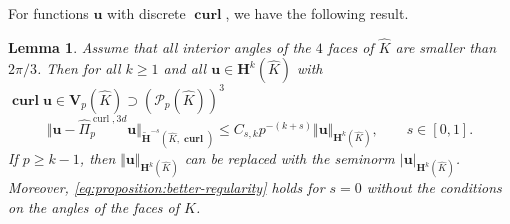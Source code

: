 \documentclass{article}
\newtheorem{lemma}[theorem]{Lemma}
\newcommand{\hatPicurlcom}{\widehat \Pi^{\operatorname*{curl},3d}_p}
\begin{document}
For functions ${\mathbf u}$ with discrete $\operatorname{\mathbf{curl}}$, we have the following result.

\begin{lemma}
\label{lemma:better-regularity}
Assume that all interior angles of the $4$ faces of $\widehat K$ are smaller than $2 \pi/3$.
Then for all $k\geq1$ and
all ${\mathbf{u}}\in{\mathbf{H}}^{k}(\widehat{K})$ with $\operatorname*{\mathbf{curl}}%
{\mathbf{u}}\in {\mathbf V}_p(\widehat K)  \supset ({\mathcal{P}}_{p}(\widehat{K}))^{3}$ 
\begin{equation}
\Vert{\mathbf{u}}-\hatPicurlcom{\mathbf{u}}%
\Vert_{\widetilde{\mathbf{H}}^{-s}(\widehat{K},\operatorname{\mathbf{curl}})}\leq C_{s,k}p^{-(k+s)}\Vert{\mathbf{u}}\Vert
_{\mathbf{H}^{k}(\widehat{K})}, \qquad s\in [0,1].
\label{eq:proposition:better-regularity}%
\end{equation}
If $p\geq k-1$, then $\Vert{\mathbf{u}}\Vert_{{\mathbf{H}}%
^{k}(\widehat{K})}$ can be replaced with the seminorm $|{\mathbf{u}%
}|_{{\mathbf{H}}^{k}(\widehat{K})}$. 
Moreover, 
\eqref{eq:proposition:better-regularity} holds for $s =0$ without the conditions on the angles of the
faces of $\widehat K$.
\end{lemma}
\end{document}
